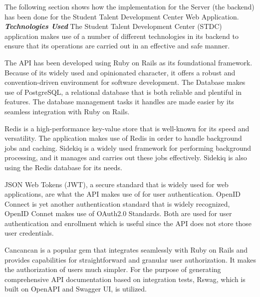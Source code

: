 \begin{justify}
    The following section shows how the implementation for the Server (the backend) has been done for the Student Talent Development Center Web Application.\\

    \vspace{0.25cm}
    \newendline \textbf{\textit{Technologies Used}}\newendline
    The Student Talent Development Center (STDC) application makes use of a number of different technologies in its backend to ensure that its operations are carried out in an effective and safe manner.

    \vspace{0.25cm}
    \newendline The  API has been developed using Ruby on Rails as its foundational framework. Because of its widely used and opinionated character, it offers a robust and convention-driven environment for software development. The Database makes use of PostgreSQL, a relational database that is both reliable and plentiful in features. The database management tasks it handles are made easier by its seamless integration with Ruby on Rails.

    \vspace{0.25cm}
    \newendline Redis is a high-performance key-value store that is well-known for its speed and versatility. The application makes use of Redis in order to handle background jobs and caching. Sidekiq is a widely used framework for performing background processing, and it manages and carries out these jobs effectively. Sidekiq is also using the Redis database for its needs.

    \vspace{0.25cm}
    \newendline JSON Web Tokens (JWT), a secure standard that is widely used for web applications, are what the API makes use of for user authentication. OpenID Connect is yet another authentication standard that is widely recognized, OpenID Connet makes use of OAuth2.0 Standards. Both are used for user authentication and enrollment which is useful since the API does not store those user credentials.

    \vspace{0.25cm}
    \newendline Cancancan is a popular gem that integrates seamlessly with Ruby on Rails and provides capabilities for straightforward and granular user authorization. It makes the authorization of users much simpler. For the purpose of generating comprehensive API documentation based on integration tests, Rswag, which is built on OpenAPI and Swagger UI, is utilized.


\end{justify}
